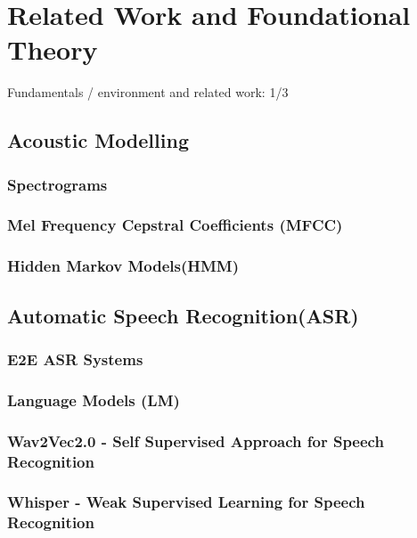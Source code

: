
\chapter{Related Work and Foundational Theory}%
\label{sec:fundamentals}

Fundamentals / environment and related work: 1/3

\section{Acoustic Modelling}%
\label{sec:acousticmodelling}

\subsection{Spectrograms}%
\label{sec:spectrograms}

\subsection{Mel Frequency Cepstral Coefficients (MFCC)}%
\label{sec:mfcc}

\subsection{Hidden Markov Models(HMM)}%
\label{sec:hmm}

\section{Automatic Speech Recognition(ASR)}%
\label{sec:automaticspeechrecognition}

\subsection{E2E ASR Systems}%
\label{sec:e2easrsystems}

\subsection{Language Models (LM)}%
\label{sec:languagemodels}

\subsection{Wav2Vec2.0 - Self Supervised Approach for Speech Recognition}%
\label{sec:wav2vec2}

\subsection{Whisper - Weak Supervised Learning for Speech Recognition}%
\label{sec:whisper}

